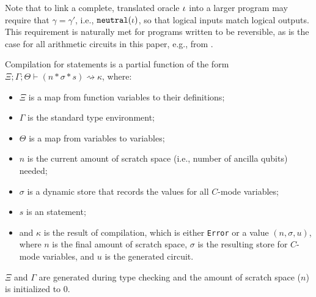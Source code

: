 Note that to link a complete, translated oracle $\iota$ into a larger \sqir program may require that $\gamma = \gamma'$, i.e., $\texttt{neutral}(\iota)$, so that logical inputs match logical outputs. This requirement is naturally met for programs written to be reversible, as is the case for all arithmetic circuits in this paper, e.g.,  from . %

Compilation for \vqimp statements is a partial function of the form $\Xi;\Gamma;\Theta\vdash (n * \sigma * s) \rightsquigarrow \kappa$, where:

\begin{itemize}
  \item $\Xi$ is a map from function variables to their definitions;
  \item $\Gamma$ is the standard type environment;
  \item $\Theta$ is a map from \vqimp variables to \vqir variables;
  \item $n$ is the current amount of scratch space (i.e., number of ancilla qubits) needed;
  \item $\sigma$ is a dynamic store that records the values for all $C$-mode variables;
  \item $s$ is an \vqimp statement;
  \item and $\kappa$ is the result of compilation, which is either \texttt{Error} or a value $(n,\sigma,u)$, where $n$ is the final amount of scratch space, $\sigma$ is the resulting store for $C$-mode variables, and $u$ is the generated \oqasm circuit.
\end{itemize}
$\Xi$ and $\Gamma$ are generated during type checking and the amount of scratch space ($n$) is initialized to 0.



